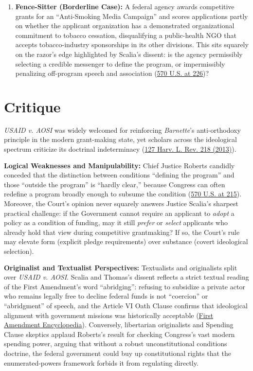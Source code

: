 \documentclass[12pt]{article}
\begin{document}
\begin{enumerate}
  \item \textbf{Fence-Sitter (Borderline Case):} A federal agency awards competitive grants for an ``Anti-Smoking Media Campaign'' and scores applications partly on whether the applicant organization has a demonstrated organizational commitment to tobacco cessation, disqualifying a public-health NGO that accepts tobacco-industry sponsorships in its other divisions. This sits squarely on the razor's edge highlighted by Scalia's dissent: is the agency permissibly selecting a credible messenger to define the program, or impermissibly penalizing off-program speech and association (\href{https://supreme.justia.com/cases/federal/us/570/205/}{570 U.S. at 226})?
\end{enumerate}

\section{Critique}
\textit{USAID v. AOSI} was widely welcomed for reinforcing \textit{Barnette}'s anti-orthodoxy principle in the modern grant-making state, yet scholars across the ideological spectrum criticize its doctrinal indeterminacy (\href{https://harvardlawreview.org/print/vol-127/first-amendment-ae-freedom-of-speech-ae-unconstitutional-conditions-ae-agency-for-international-development-v-alliance-for-open-society-international-inc/}{127 Harv. L. Rev. 218 (2013)}).

\textbf{Logical Weaknesses and Manipulability:} Chief Justice Roberts candidly conceded that the distinction between conditions ``defining the program'' and those ``outside the program'' is ``hardly clear,'' because Congress can often redefine a program broadly enough to subsume the condition (\href{https://supreme.justia.com/cases/federal/us/570/205/}{570 U.S. at 215}). Moreover, the Court's opinion never squarely answers Justice Scalia's sharpest practical challenge: if the Government cannot require an applicant to \emph{adopt} a policy as a condition of funding, may it still \emph{prefer} or \emph{select} applicants who already hold that view during competitive grantmaking? If so, the Court's rule may elevate form (explicit pledge requirements) over substance (covert ideological selection).

\textbf{Originalist and Textualist Perspectives:} Textualists and originalists split over \textit{USAID v. AOSI}. Scalia and Thomas's dissent reflects a strict textual reading of the First Amendment's word ``abridging'': refusing to subsidize a private actor who remains legally free to decline federal funds is not ``coercion'' or ``abridgment'' of speech, and the Article VI Oath Clause confirms that ideological alignment with government missions was historically acceptable (\href{https://firstamendment.mtsu.edu/article/agency-for-international-development-v-alliance-for-open-society/}{First Amendment Encyclopedia}). Conversely, libertarian originalists and Spending Clause skeptics applaud Roberts's result for checking Congress's vast modern spending power, arguing that without a robust unconstitutional conditions doctrine, the federal government could buy up constitutional rights that the enumerated-powers framework forbids it from regulating directly.
\end{document}
